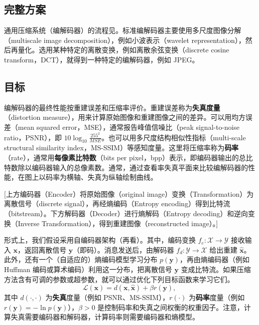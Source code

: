 \subsection{完整方案}

通用压缩系统（编解码器）的流程见。标准编解码器主要使用多尺度图像分解（multiscale image decomposition），例如小波表示（wavelet representation），然后再量化。选用某种特定的离散变换，例如离散余弦变换（discrete cosine transform，DCT），就得到一种特定的编解码器，例如 JPEG。

\subsection{目标}

编解码器的最终性能按重建误差和压缩率评价。重建误差称为\textbf{失真度量}（distortion measure），用来计算原始图像和重建图像之间的差异。可以用均方误差（mean squared error，MSE），通常报告峰值信噪比（peak signal-to-noise ratio，PSNR），即 $10\log_{10}\frac{255^2}{\mathit{MSE}}$。也可以用多尺度结构相似性指标（multi-scale structural similarity index，MS-SSIM）等感知度量。这里将压缩率称为\textbf{码率}（rate），通常用\textbf{每像素比特数}（bits per pixel，bpp）表示，即编码器输出的总比特数除以编码器输入的总像素数。通常，通过查看率失真平面来比较编解码器的性能，在图上以码率为横轴、失真为纵轴绘制曲线。

[上方编码器（Encoder）将原始图像（original image）变换（Transformation）为离散信号（discrete signal），再经熵编码（Entropy encoding）得到比特流（bitstream）。下方解码器（Decoder）进行熵解码（Entropy decoding）和逆向变换（Inverse Transformation），得到重建图像（reconstructed image）。]

形式上，我们假设采用自编码器架构（再看）。其中，编码变换 $f_e\colon\mathcal X\to\mathcal Y$ 接收输入 $\mathbf x$，返回离散信号 $\mathbf y$（即码）。消息发送后，由解码器 $f_d\colon\mathcal Y\to\mathcal X$ 给出重建 $\hat{\mathbf x}$。此外，还有一个（自适应的）熵编码模型学习分布 $p(\mathbf y)$，再由熵编码器（例如 Huffman 编码或算术编码）利用这一分布，把离散信号 $\mathbf y$ 变成比特流。如果压缩方法含有可调的参数或超参数，就可以通过优化下列目标函数来学习它们。
\begin{equation}
  \mathcal L(\mathbf x)=d(\mathbf x,\hat{\mathbf x})+\beta r(\mathbf y),
  \tag{10.1}\label{eq:10-01}
\end{equation}
其中 $d(\cdot,\cdot)$ 为\textbf{失真}度量（例如 PSNR、MS-SSIM），$r(\cdot)$ 为\textbf{码率}度量（例如 $r(\mathbf y)=-\ln p(\mathbf y)$），$\beta>0$ 是控制码率和失真之间权衡的权重因子。注意，计算失真需要编码器和解码器，计算码率则需要编码器和熵模型。


